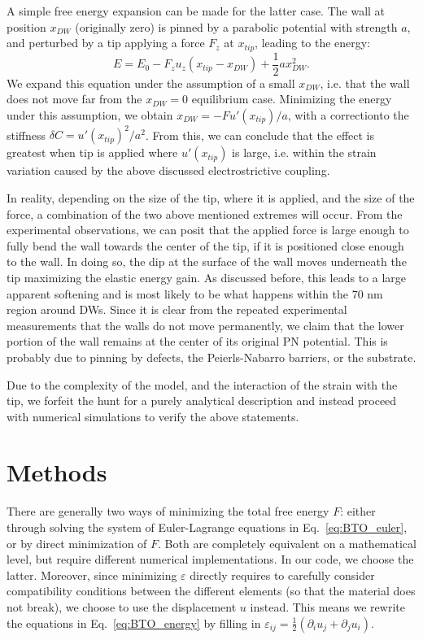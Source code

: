 A simple free energy expansion can be made for the latter case.
The wall at position $x_{DW}$ (originally zero) is pinned by a parabolic potential with strength $a$, and perturbed by a tip applying a force $F_z$ at $x_{tip}$, leading to the energy:
\begin{equation}
	E = E_0 - F_z u_z (x_{tip} - x_{DW}) + \frac{1}{2}a x_{DW}^2.
\end{equation}
We expand this equation under the assumption of a small $x_{DW}$, i.e. that the wall does not move far from the $x_{DW}=0$ equilibrium case.
Minimizing the energy under this assumption, we obtain $x_{DW} = -F u'(x_{tip})/a$, with a correctionto the stiffness $\delta C = u'(x_{tip})^2/a^2$.
From this, we can conclude that the effect is greatest when tip is applied where $u'(x_{tip})$ is large, i.e. within the strain variation caused by the above discussed electrostrictive coupling.

In reality, depending on the size of the tip, where it is applied, and the size of the force, a combination of the two above mentioned extremes will occur.
From the experimental observations, we can posit that the applied force is large enough to fully bend the wall towards the center of the tip, if it is positioned close enough to the wall.
In doing so, the dip at the surface of the wall moves underneath the tip maximizing the elastic energy gain.
As discussed before, this leads to a large apparent softening and is most likely to be what happens within the 70 nm region around DWs.
Since it is clear from the repeated experimental measurements that the walls do not move permanently, we claim that the lower portion of the wall remains at the center of its original PN potential.
This is probably due to pinning by defects, the Peierls-Nabarro barriers, or the substrate.

Due to the complexity of the model, and the interaction of the strain with the tip, we forfeit the hunt for a purely analytical description and instead proceed with numerical simulations to verify the above statements.

\section{Methods}
There are generally two ways of minimizing the total free energy $F$: either through solving the system of Euler-Lagrange equations in Eq.~\ref{eq:BTO_euler}, or by direct minimization of $F$.
Both are completely equivalent on a mathematical level, but require different numerical implementations.
In our code, we choose the latter.
Moreover, since minimizing $\varepsilon$ directly requires to carefully consider compatibility conditions between the different elements (so that the material does not break)\cite{Marton2007}, we choose to use the displacement $u$ instead.
This means we rewrite the equations in Eq.~\ref{eq:BTO_energy} by filling in $\varepsilon_{ij} = \frac{1}{2}(\partial_i u_j + \partial_j u_i)$.

